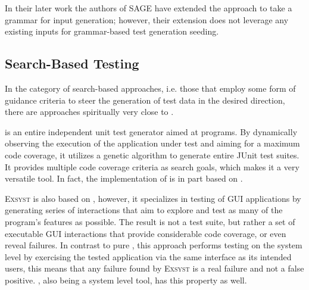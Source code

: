 In their later work \cite{Godefroid:2008:GWF:1375581.1375607} the authors of SAGE have extended the approach to
take a grammar for input generation; however, their extension does not leverage any existing inputs for
grammar-based test generation seeding.

\subsection{Search-Based Testing}
In the category of search-based approaches, i.e. those that employ some form of guidance criteria to steer the
generation of test data in the desired direction, there are approaches spiritually very close to \xmlmate.

\evosuite{}\cite{fraser2013whole} is an entire independent unit test generator aimed at \java programs. By
dynamically observing the execution of the application under test and aiming for a maximum code coverage, it
utilizes a genetic algorithm to generate entire JUnit test suites. It provides multiple code coverage
criteria as search goals, which makes it a very versatile tool. In fact, the implementation of \xmlmate is
in part based on \evosuite.

\textsc{Exsyst}\cite{gross-issta2012} is also based on \evosuite, however, it specializes in testing of \java
GUI applications by generating series of interactions that aim to explore and test as many of the program's
features as possible. The result is not a test suite, but rather a set of executable GUI interactions that
provide considerable code coverage, or even reveal failures. In contrast to pure \evosuite, this approach
performs testing on the system level by exercising the tested application via the same interface as its
intended users, this means that any failure found by \textsc{Exsyst} is a real failure and not a false
positive. \xmlmate, also being a system level tool, has this property as well.